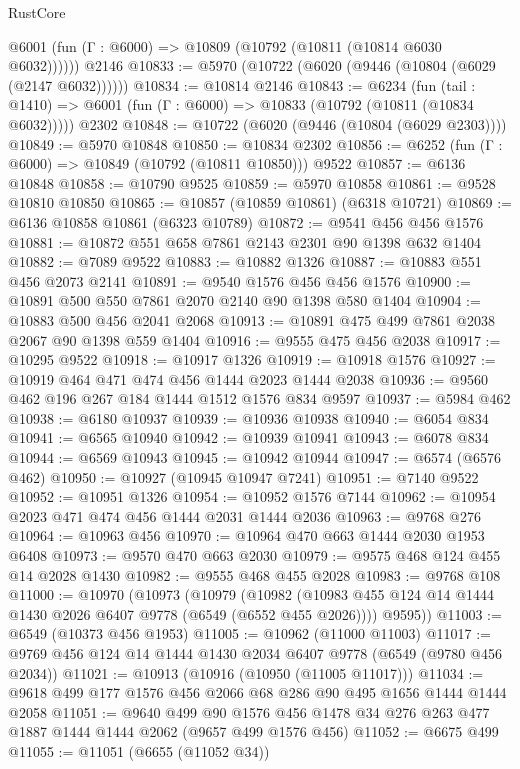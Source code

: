 \begin{lexlean}{RustCore}
\begin{coremodule}
{\begin{coremodule}
{{{{{{{{{{{{{{{{{{{{{{{{{{{{{{{{{{{{{{{{{{{{{      @6001 (fun (Γ : @6000) => @10809 (@10792 (@10811 (@10814 @6030 @6032))))))
    @2146
@10833 := @5970 (@10722 (@6020 (@9446 (@10804 (@6029 (@2147 @6032))))))
@10834 := @10814 @2146
@10843 := @6234
    (fun (tail : @1410) => @6001 (fun (Γ : @6000) => @10833 (@10792 (@10811 (@10834 @6032)))))
    @2302
@10848 := @10722 (@6020 (@9446 (@10804 (@6029 @2303))))
@10849 := @5970 @10848
@10850 := @10834 @2302
@10856 := @6252 (fun (Γ : @6000) => @10849 (@10792 (@10811 @10850))) @9522
@10857 := @6136 @10848
@10858 := @10790 @9525
@10859 := @5970 @10858
@10861 := @9528 @10810 @10850
@10865 := @10857 (@10859 @10861) (@6318 @10721)
@10869 := @6136 @10858 @10861 (@6323 @10789)
@10872 := @9541 @456 @456 @1576
@10881 := @10872 @551 @658 @7861 @2143 @2301 @90 @1398 @632 @1404
@10882 := @7089 @9522
@10883 := @10882 @1326
@10887 := @10883 @551 @456 @2073 @2141
@10891 := @9540 @1576 @456 @456 @1576
@10900 := @10891 @500 @550 @7861 @2070 @2140 @90 @1398 @580 @1404
@10904 := @10883 @500 @456 @2041 @2068
@10913 := @10891 @475 @499 @7861 @2038 @2067 @90 @1398 @559 @1404
@10916 := @9555 @475 @456 @2038
@10917 := @10295 @9522
@10918 := @10917 @1326
@10919 := @10918 @1576
@10927 := @10919 @464 @471 @474 @456 @1444 @2023 @1444 @2038
@10936 := @9560 @462 @196 @267 @184 @1444 @1512 @1576 @834 @9597
@10937 := @5984 @462
@10938 := @6180 @10937
@10939 := @10936 @10938
@10940 := @6054 @834
@10941 := @6565 @10940
@10942 := @10939 @10941
@10943 := @6078 @834
@10944 := @6569 @10943
@10945 := @10942 @10944
@10947 := @6574 (@6576 @462)
@10950 := @10927 (@10945 @10947 @7241)
@10951 := @7140 @9522
@10952 := @10951 @1326
@10954 := @10952 @1576 @7144
@10962 := @10954 @2023 @471 @474 @456 @1444 @2031 @1444 @2036
@10963 := @9768 @276
@10964 := @10963 @456
@10970 := @10964 @470 @663 @1444 @2030 @1953 @6408
@10973 := @9570 @470 @663 @2030
@10979 := @9575 @468 @124 @455 @14 @2028 @1430
@10982 := @9555 @468 @455 @2028
@10983 := @9768 @108
@11000 := @10970
    (@10973
      (@10979
        (@10982 (@10983 @455 @124 @14 @1444 @1430 @2026 @6407 @9778 (@6549 (@6552 @455 @2026))))
        @9595))
@11003 := @6549 (@10373 @456 @1953)
@11005 := @10962 (@11000 @11003)
@11017 := @9769 @456 @124 @14 @1444 @1430 @2034 @6407 @9778 (@6549 (@9780 @456 @2034))
@11021 := @10913 (@10916 (@10950 (@11005 @11017)))
@11034 := @9618 @499 @177 @1576 @456 @2066 @68 @286 @90 @495 @1656 @1444 @1444 @2058
@11051 := @9640
    @499
    @90
    @1576
    @456
    @1478
    @34
    @276
    @263
    @477
    @1887
    @1444
    @1444
    @2062
    (@9657 @499 @1576 @456)
@11052 := @6675 @499
@11055 := @11051 (@6655 (@11052 @34))
}}}}}}}}}}}}}}}}}}}}}}}}}}}}}}}}}}}}}}}}}}}}}
\end{coremodule}}
\end{coremodule}
\end{lexlean}
